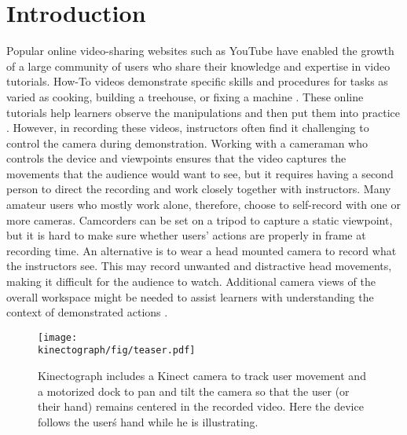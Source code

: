 \section{Introduction}

Popular online video-sharing websites such as YouTube have enabled the growth of a large community of users who share their knowledge and expertise in video tutorials. How-To videos demonstrate specific skills and procedures for tasks as varied as cooking, building a treehouse, or fixing a machine \cite{Torrey:2007he}.
These online tutorials help learners observe the manipulations and then put them into practice \cite{Torrey:2009fc}. However, in recording these videos, instructors often find it challenging to control the camera during demonstration.
%
Working with a cameraman who controls the device and viewpoints ensures that the video captures the movements that the audience would want to see, but it requires having a second person to direct the recording and work closely together with instructors. Many amateur users who mostly work alone, therefore, choose to self-record with one or more cameras. Camcorders can be set on a tripod to capture a static viewpoint, but it is hard to make sure whether users' actions are properly in frame at recording time. An alternative is to wear a head mounted camera to record what the instructors see. This may record unwanted and distractive head movements, making it difficult for the audience to watch. Additional camera views of the overall workspace might be needed to assist learners with understanding the context of demonstrated actions \cite{Fussell:2003te}.

\begin{figure}[t]
\centering
\texttt{[image: \\kinectograph/fig/teaser.pdf]}
\caption{Kinectograph includes a Kinect camera to track user movement and a motorized dock to pan and tilt the camera so that the user (or their hand) remains centered in the recorded video. Here the device follows the user\'s hand while he is illustrating.}
\label{fig:figure1}
\end{figure}

